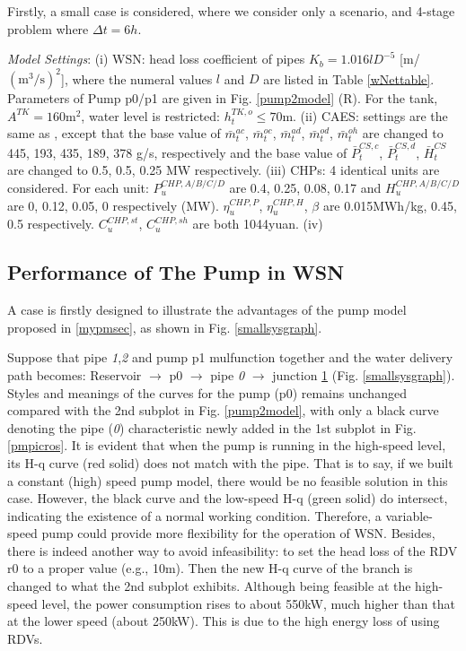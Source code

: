 \documentclass[journal,twoside,web]{ieeecolor}
\begin{document}
Firstly, a small case is considered, where we consider only a scenario, and 4-stage problem where $\Delta t=6h$.

\textit{Model Settings}: (i) WSN: head loss coefficient of pipes $K_b=1.016lD^{-5}$ [m/$({\text{m}}^3/\text{s})^2$], where the numeral values $l$ and $D$ are listed in Table \ref{wNettable}. Parameters of Pump p0/p1 are given in Fig. \ref{pump2model} (R). 
For the tank, $A^{TK} = 160\text{m}^2$, water level is restricted: $h_t^{TK,o}\le70\text{m}$.
(ii) CAES: settings are the same as \cite{AACAES}, except that the base value of $\bar m^{ac}_t$, $\bar m^{oc}_t$, $\bar m^{ad}_t$, $\bar m^{od}_t$, $\bar m^{oh}_t$ are changed to 445, 193, 435, 189, 378 g/s, respectively and the base value of $\bar P^{CS,c}_t$, $\bar P^{CS,d}_t$, $\bar H^{CS}_t$ are changed to 0.5, 0.5, 0.25 MW respectively. 
(iii) CHPs: 4 identical units are considered. For each unit:  $P^{CHP,A/B/C/D}_u$ are 0.4, 0.25, 0.08, 0.17 and $H^{CHP,A/B/C/D}_u$ are 0, 0.12, 0.05, 0 respectively (MW). 
$\eta_u^{CHP,P}$, $\eta_u^{CHP,H}$, $\beta$ are 0.015MWh/kg, 0.45, 0.5 respectively.
$C^{CHP,st}_u$, $C^{CHP,sh}_u$ are both 1044yuan.
(iv) 

\subsection{Performance of The Pump in WSN}
A case is firstly designed to illustrate the advantages of the pump model proposed in \ref{mypmsec}, as shown in Fig. \ref{smallsysgraph}.

Suppose that pipe \textit{1},\textit{2} and pump p1 mulfunction together and the water delivery path becomes: Reservoir $\to$ p0 $\to$ pipe \textit{0} $\to$ junction \underline{1} (Fig. \ref{smallsysgraph}).
Styles and meanings of the curves for the pump (p0) remains unchanged compared with the 2nd subplot in Fig. \ref{pump2model}, with only a black curve denoting the pipe (\textit{0}) characteristic newly added in the 1st subplot in Fig. \ref{pmpicros}.
It is evident that when the pump is running in the high-speed level, its H-q curve (red solid) does not match with the pipe.
That is to say, if we built a constant (high) speed pump model, there would be no feasible solution in this case.
However, the black curve and the low-speed H-q (green solid) do intersect, indicating the existence of a normal working condition.
Therefore, a variable-speed pump could provide more flexibility for the operation of WSN.
Besides, there is indeed another way to avoid infeasibility: to set the head loss of the RDV r0 to a proper value (e.g., 10m).
Then the new H-q curve of the branch is changed to what the 2nd subplot exhibits.
Although being feasible at the high-speed level, the power consumption rises to about 550kW, much higher than that at the lower speed (about 250kW).
This is due to the high energy loss of using RDVs.
\end{document}
